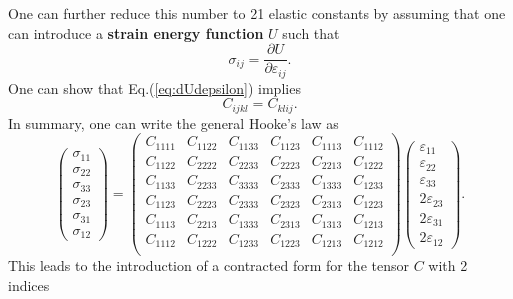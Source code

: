 One can further reduce this number to 21 elastic constants by assuming
that one can introduce a {\bf strain energy function} $U$ such that
%
\begin{equation}\label{eq:dUdepsilon}
  \sigma_{ij}=\frac{\partial U}{\partial \varepsilon_{ij}}.
\end{equation}
%
One can show that Eq.(\ref{eq:dUdepsilon}) implies
%
\begin{equation}
  C_{ijkl}=C_{klij}.
\end{equation}
%
In summary, one can write the general Hooke's law as
%
\begin{equation}\label{eq:general_stress_strain}
  \left(\begin{array}{c}
    \sigma_{11} \\
    \sigma_{22} \\
    \sigma_{33} \\
    \sigma_{23} \\
    \sigma_{31} \\
    \sigma_{12}
  \end{array}\right)
  =
  \left(
    \begin{array}{cccccc}
      C_{1111} & C_{1122} & C_{1133} & C_{1123} & C_{1113} & C_{1112} \\
      C_{1122} & C_{2222} & C_{2233} & C_{2223} & C_{2213} & C_{1222} \\
      C_{1133} & C_{2233} & C_{3333} & C_{2333} & C_{1333} & C_{1233} \\
      C_{1123} & C_{2223} & C_{2333} & C_{2323} & C_{2313} & C_{1223} \\
      C_{1113} & C_{2213} & C_{1333} & C_{2313} & C_{1313} & C_{1213} \\
      C_{1112} & C_{1222} & C_{1233} & C_{1223} & C_{1213} & C_{1212} \\
    \end{array}
  \right)
  \left(\begin{array}{c}
    \varepsilon_{11} \\
    \varepsilon_{22} \\
    \varepsilon_{33} \\
    2\varepsilon_{23} \\
    2\varepsilon_{31} \\
    2\varepsilon_{12}
  \end{array}\right).
\end{equation}
%
This leads to the introduction of a contracted form for the tensor $C$
with 2 indices
%
